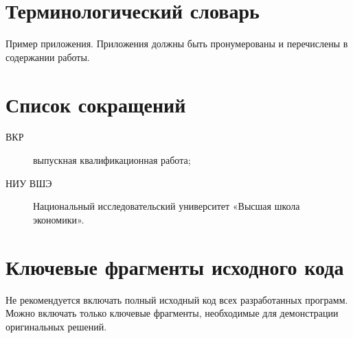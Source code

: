 \documentclass[14pt,a4paper]{extreport}
\numberwithin{figure}{chapter}
\numberwithin{table}{chapter}
\numberwithin{equation}{chapter}
\begin{document}
\begin{appendices}

\chapter{Терминологический словарь}

Пример приложения. Приложения должны быть пронумерованы и перечислены в
содержании работы.

\chapter{Список сокращений}

\begin{description}
    \item[ВКР] выпускная квалификационная работа;
    \item[НИУ ВШЭ] Национальный исследовательский университет «Высшая школа экономики».
\end{description}

\chapter{Ключевые фрагменты исходного кода}

Не рекомендуется включать полный исходный код всех разработанных программ.
Можно включать только ключевые фрагменты, необходимые для демонстрации
оригинальных решений.

\end{appendices}
\end{document}
